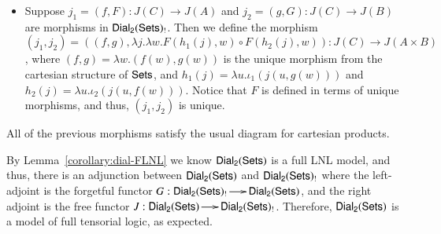 \begin{report}
\begin{itemize}
\begin{itemize}
    \item Suppose $j_1 = (f , F) : J(C) \to J(A)$ and $j_2 = (g , G) : J(C) \to
      J(B)$ are morphisms in $\mathsf{Dial_2}(\mathsf{Sets})_!$.  Then we define the morphism
      $(j_1, j_2) = ((f,g),\lambda j.\lambda w.F(h_1(j),w) \circ F(h_2(j),w))
      : J(C) \to J(A \times B)$, where $(f,g) = \lambda w.(f(w),g(w))$ is the unique morphism
      from the cartesian structure of $\mathsf{Sets}$, and
      $h_1(j) = \lambda u.\iota_1(j(u,g(w)))$ and
      $h_2(j) = \lambda u.\iota_2(j(u,f(w)))$.
      Notice that $F$ is defined in terms of unique morphisms, and thus,
      $(j_1,j_2)$ is unique.
    \end{itemize}
    All of the previous morphisms satisfy the usual diagram for
    cartesian products.    
  \end{itemize}

  By Lemma~\ref{corollary:dial-FLNL} we know $\mathsf{Dial_2}(\mathsf{Sets})$ is a full LNL
  model, and thus, there is an adjunction between $\mathsf{Dial_2}(\mathsf{Sets})$ and
  $\mathsf{Dial_2}(\mathsf{Sets})_!$ where the left-adjoint is the forgetful functor $G :
  \mathsf{Dial_2}(\mathsf{Sets})_! \to \mathsf{Dial_2}(\mathsf{Sets})$, and the right adjoint is the free functor $J :
  \mathsf{Dial_2}(\mathsf{Sets}) \to \mathsf{Dial_2}(\mathsf{Sets})_!$.  Therefore, $\mathsf{Dial_2}(\mathsf{Sets})$ is a model of full tensorial
  logic, as expected.
  \end{report}
